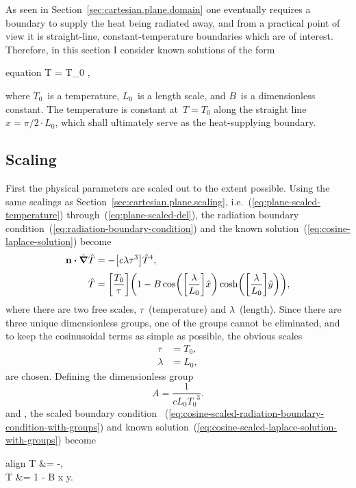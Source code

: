 As seen in Section~\ref{sec:cartesian.plane.domain}
one eventually requires a boundary to supply the heat being radiated away,
and from a practical point of view it is
straight-line, constant-temperature boundaries which are of interest.
Therefore, in this section I consider known solutions of the form
\begin{important}{equation}
  T = T_0 ,
  \label{eq:cosine-laplace-solution}
\end{important}
where $T_0$~is a temperature, $L_0$~is a length scale,
and $B$~is a dimensionless constant.
The temperature is constant at~$T = T_0$
along the straight line~$x = \pi/2 \cdot L_0$,
which shall ultimately serve as the heat-supplying boundary.

\subsection{Scaling}
\label{sec:cartesian.cosine.scaling}

First the physical parameters are scaled out to the extent possible.
Using the same scalings as Section~\ref{sec:cartesian.plane.scaling},
i.e.~(\ref{eq:plane-scaled-temperature}) through~(\ref{eq:plane-scaled-del}),
the radiation boundary condition~(\ref{eq:radiation-boundary-condition})
and the known solution~(\ref{eq:cosine-laplace-solution})
become
\begin{align}
  \normalvec \dotp \scaleddel \scaled{T}
    &= -\group{c \lambda \tau^3} \scaled{T}^4,
    \label{eq:cosine-scaled-radiation-boundary-condition-with-groups}
    \\[\tallspace]
  \scaled{T}
    &=
      \group{\frac{T_0}{\tau}}
      \roundbr*{
        1 -
          B
          \cos \roundbr*{\group{\frac{\lambda}{L_0}} \scaled{x}}
          \cosh \roundbr*{\group{\frac{\lambda}{L_0}} \scaled{y}}
      },
    \label{eq:cosine-scaled-laplace-solution-with-groups}
\end{align}
where there are two free scales, $\tau$~(temperature) and $\lambda$~(length).
Since there are three unique dimensionless groups,
one of the groups cannot be eliminated,
and to keep the cosinusoidal terms as simple as possible,
the obvious scales
\begin{align}
  \tau &= T_0,
    \label{eq:cosine-temperature-scale} \\
  \lambda &= L_0,
    \label{eq:cosine-length-scale}
\end{align}
are chosen.
Defining the dimensionless group
\begin{equation}
  A = \frac{1}{c L_0 {T_0}^3}.
  \label{eq:cosine-dimensionless-group}
\end{equation}
and ,
the scaled boundary condition~%
  (\ref{eq:cosine-scaled-radiation-boundary-condition-with-groups})
and known solution~(\ref{eq:cosine-scaled-laplace-solution-with-groups})
become
\begin{important}{align}
  \normalvec \dotp \del T &= -,
    \label{eq:cosine-scaled-radiation-boundary-condition} \\[\tallspace]
  T &= 1 - B \cos x \cosh y.
    \label{eq:cosine-scaled-laplace-solution}
\end{important}

